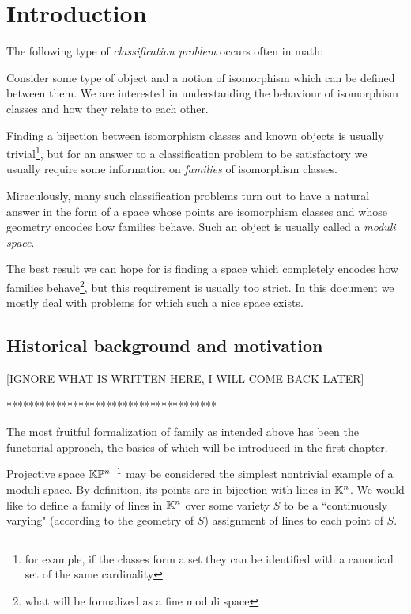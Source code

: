 \chapter*{Introduction}
The following type of \textit{classification problem} occurs often in math:
\begin{center}
Consider some type of object and a notion of isomorphism which can be defined between them. We are interested in understanding the behaviour of isomorphism classes and how they relate to each other.
\end{center}
Finding a bijection between isomorphism classes and known objects is usually trivial\footnote{for example, if the classes form a set they can be identified with a canonical set of the same cardinality}, but for an answer to a classification problem to be satisfactory we usually require some information on \textit{families} of isomorphism classes.\medskip

Miraculously, many such classification problems turn out to have a natural answer in the form of a space whose points are isomorphism classes and whose geometry encodes how families behave. Such an object is usually called a \textit{moduli space}.

The best result we can hope for is finding a space which completely encodes how families behave\footnote{what will be formalized as a fine moduli space}, but this requirement is usually too strict. 
In this document we mostly deal with problems for which such a nice space exists.\medskip



\section*{Historical background and motivation}

[IGNORE WHAT IS WRITTEN HERE, I WILL COME BACK LATER]

**************************************

The most fruitful formalization of family as intended above has been the functorial approach, the basics of which will be introduced in the first chapter.


Projective space $\mathbb{K}\mathbb{P}^{n-1}$ may be considered the simplest nontrivial example of a moduli space. By definition, its points are in bijection with lines in $\mathbb{K}^n$. We would like to define a family of lines in $\mathbb{K}^n$ over some variety $S$ to be a ``continuously varying" (according to the geometry of $S$) assignment of lines to each point of $S$. 

